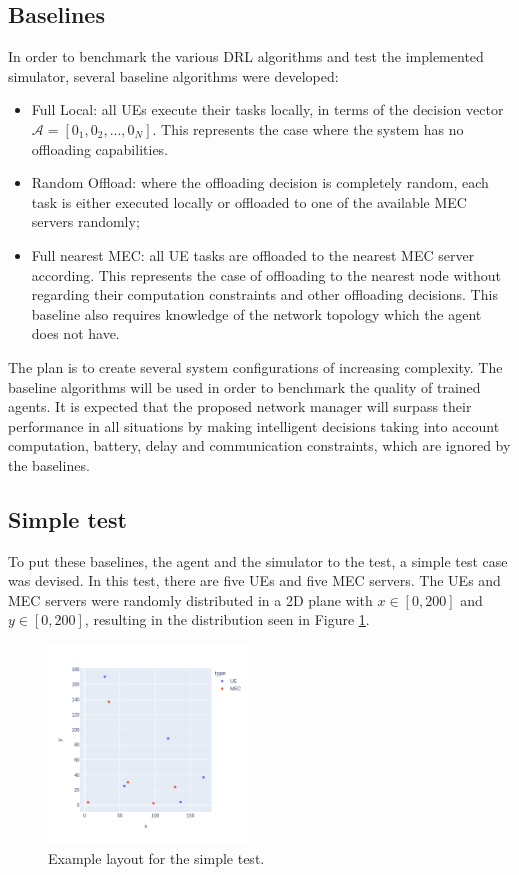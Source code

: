 \documentclass[conference]{IEEEtran}
\begin{document}
\subsection{Baselines} \label{baselines}
\noindent In order to benchmark the various \acrshort{DRL} algorithms and test the implemented simulator, several baseline algorithms were developed:

\begin{itemize}
    \item Full Local: all \acrshort{UE}s execute their tasks locally, in terms of the decision vector $\mathcal{A}=[0_1, 0_2, ..., 0_N]$. This represents the case where the system has no offloading capabilities.
    \item Random Offload: where the offloading decision is completely random, each task is either executed locally or offloaded to one of the available \acrshort{MEC} servers randomly;
    \item Full nearest \acrshort{MEC}: all \acrshort{UE} tasks are offloaded to the nearest \acrshort{MEC} server according. This represents the case of offloading to the nearest node without regarding their computation constraints and other offloading decisions. This baseline also requires knowledge of the network topology which the agent does not have.
\end{itemize}

The plan is to create several system configurations of increasing complexity. The baseline algorithms will be used in order to benchmark the quality of trained agents. It is expected that the proposed network manager will surpass their performance in all situations by making intelligent decisions taking into account computation, battery, delay and communication constraints, which are ignored by the baselines.

\subsection{Simple test} \label{simple_test}

To put these baselines, the agent and the simulator to the test, a simple test case was devised. In this test, there are five \acrshort{UE}s and five \acrshort{MEC} servers. The UEs and MEC servers were randomly distributed in a 2D plane with $x \in [0, 200]$ and $y \in [0, 200]$, resulting in the distribution seen in Figure \ref{example_layout}.

\begin{figure}[H]
  \centering
  \includegraphics[width=200px]{images/example_layout.png}
  \caption{Example layout for the simple test.}  \label{example_layout}
\end{figure}
\end{document}
